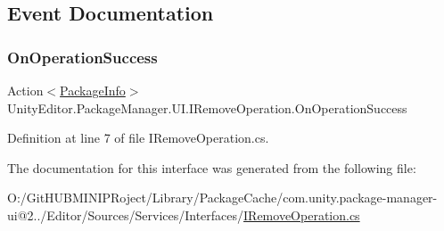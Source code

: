 \subsection{Event Documentation}
\mbox{\label{interface_unity_editor_1_1_package_manager_1_1_u_i_1_1_i_remove_operation_a533765ac0561fe7a7dd0eb718239594b}} 
\subsubsection{\texorpdfstring{OnOperationSuccess}{OnOperationSuccess}}
{\footnotesize\ttfamily Action$<$\mbox{\hyperlink{class_unity_editor_1_1_package_manager_1_1_u_i_1_1_package_info}{Package\+Info}}$>$ Unity\+Editor.\+Package\+Manager.\+U\+I.\+I\+Remove\+Operation.\+On\+Operation\+Success}



Definition at line 7 of file I\+Remove\+Operation.\+cs.



The documentation for this interface was generated from the following file\+:\begin{DoxyCompactItemize}
\item 
O\+:/\+Git\+H\+U\+B\+M\+I\+N\+I\+P\+Roject/\+Library/\+Package\+Cache/com.\+unity.\+package-\/manager-\/ui@2../\+Editor/\+Sources/\+Services/\+Interfaces/\mbox{\hyperlink{_i_remove_operation_8cs}{I\+Remove\+Operation.\+cs}}\end{DoxyCompactItemize}
